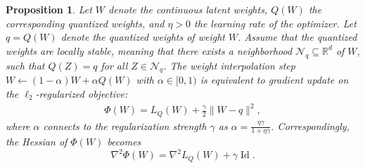 \documentclass[10pt,a4paper]{amsart}
\newtheorem{proposition}{Proposition}
\DeclareMathOperator{\id}{Id}
\begin{document}
\begin{proposition}\label{prop_connect}
Let $W$ denote the continuous latent weights, $Q(W)$ the corresponding quantized weights, and $\eta > 0$ the learning rate of the optimizer.
Let $q = Q(W)$ denote the quantized weights of weight $W$. Assume that the quantized weights are locally stable, meaning that there exists a neighborhood $\mathcal{N}_q \subseteq \mathbb{R}^d$ of $W$, such that $Q(Z)=q$ for all $Z \in \mathcal{N}_q$.
The weight interpolation step $W \leftarrow (1-\alpha)W + \alpha Q(W)$ with $\alpha \in [0, 1)$ is equivalent to gradient update on the $\ell_2$-regularized objective:
\begin{align}
    \Phi(W) = L_Q(W) + \frac{\gamma}{2} \|W - q\|^2,
\end{align}
where $\alpha$ connects to the regularization strength $\gamma$ as $\alpha = \frac{\eta \gamma}{1 + \eta \gamma}$. Correspondingly, the Hessian of $\Phi(W)$ becomes \[ \nabla^2 \Phi(W) = \nabla^2 L_Q(W) + \gamma \id. \]
\end{proposition}
\end{document}
